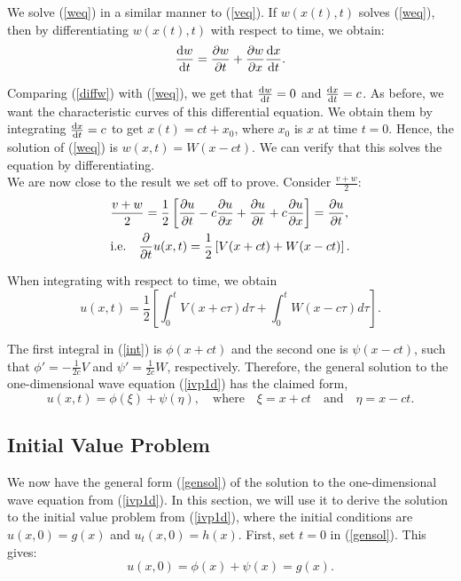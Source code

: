 \documentclass[a4paper, 12pt]{article}
\numberwithin{equation}{section}
\begin{document}
We solve (\ref{weq}) in a similar manner to (\ref{veq}). If $w(x(t), t)$ solves
(\ref{weq}), then by differentiating $w(x(t),t)$ with respect to time, we obtain:
\begin{equation} \label{diffw}
    \diff{w}{t}=\diffp[1]{w}{t}+\diffp[1]{w}{x}\diff{x}{t}. 
\end{equation}

Comparing (\ref{diffw}) with (\ref{weq}), we get that $\diff{w}{t}=0$ and
$\diff{x}{t}=c$. As before, we want the characteristic curves of this
differential equation. We obtain them by integrating $\diff{x}{t}=c$ to get
$x(t)=ct+x_0$, where $x_0$ is $x$ at time $t=0$. Hence, the solution of
(\ref{weq}) is $w(x,t)=W(x-ct)$. We can verify that this solves the equation by
differentiating. \\

We are now close to the result we set off to prove. Consider $\frac{v+w}{2}$:
\begin{equation*}
    \begin{aligned}
    &\frac{v+w}{2}=\frac{1}{2}\left[\diffp[1]{u}{t}-c\diffp[1]{u}{x}+\diffp[1]{u}{t}+c\diffp[1]{u}{x}\right]=\diffp[1]{u}{t},\\
    &\textrm{i.e.} \quad \diffp[1]{}{t}u(x, t)=\frac{1}{2}\left[V(x+ct)+W(x-ct)\right].
    \end{aligned}
\end{equation*}

When integrating with respect to time, we obtain
\begin{equation} \label{int}
    u(x,t)=\frac{1}{2}\left[\int_0^t{V(x+c\tau)d\tau}+\int_0^t{W(x-c\tau)d\tau}\right].
\end{equation}

The first integral in (\ref{int}) is $\phi(x+ct)$ and the second one is
$\psi(x-ct)$, such that $\phi'=-\frac{1}{2c}V$ and $\psi'=\frac{1}{2c}W$,
respectively. Therefore, the general solution to the one-dimensional wave
equation (\ref{ivp1d}) has the claimed form, 
\begin{equation} \label{gensol}
    u(x, t)=\phi(\xi)+\psi(\eta), \quad \textrm{where} \quad \xi=x+ct \quad \textrm{and} \quad \eta=x-ct.
\end{equation}

\subsection{Initial Value Problem}
We now have the general form (\ref{gensol}) of the solution to the
one-dimensional wave equation from (\ref{ivp1d}). In this section, we will use
it to derive the solution to the initial value problem from (\ref{ivp1d}),
where the initial conditions are $u(x,0)=g(x)$ and $u_t(x,0)=h(x)$. First, set $t=0$
in (\ref{gensol}). This gives:
\begin{equation} \label{t=0}
    u(x,0)=\phi(x)+\psi(x)=g(x).
\end{equation}
\end{document}
